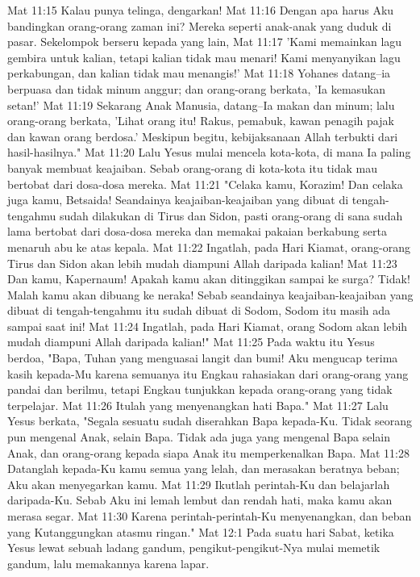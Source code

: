 Mat 11:15  Kalau punya telinga, dengarkan!
Mat 11:16  Dengan apa harus Aku bandingkan orang-orang zaman ini? Mereka seperti anak-anak yang duduk di pasar. Sekelompok berseru kepada yang lain,
Mat 11:17  'Kami memainkan lagu gembira untuk kalian, tetapi kalian tidak mau menari! Kami menyanyikan lagu perkabungan, dan kalian tidak mau menangis!'
Mat 11:18  Yohanes datang--ia berpuasa dan tidak minum anggur; dan orang-orang berkata, 'Ia kemasukan setan!'
Mat 11:19  Sekarang Anak Manusia, datang--Ia makan dan minum; lalu orang-orang berkata, 'Lihat orang itu! Rakus, pemabuk, kawan penagih pajak dan kawan orang berdosa.' Meskipun begitu, kebijaksanaan Allah terbukti dari hasil-hasilnya."
Mat 11:20  Lalu Yesus mulai mencela kota-kota, di mana Ia paling banyak membuat keajaiban. Sebab orang-orang di kota-kota itu tidak mau bertobat dari dosa-dosa mereka.
Mat 11:21  "Celaka kamu, Korazim! Dan celaka juga kamu, Betsaida! Seandainya keajaiban-keajaiban yang dibuat di tengah-tengahmu sudah dilakukan di Tirus dan Sidon, pasti orang-orang di sana sudah lama bertobat dari dosa-dosa mereka dan memakai pakaian berkabung serta menaruh abu ke atas kepala.
Mat 11:22  Ingatlah, pada Hari Kiamat, orang-orang Tirus dan Sidon akan lebih mudah diampuni Allah daripada kalian!
Mat 11:23  Dan kamu, Kapernaum! Apakah kamu akan ditinggikan sampai ke surga? Tidak! Malah kamu akan dibuang ke neraka! Sebab seandainya keajaiban-keajaiban yang dibuat di tengah-tengahmu itu sudah dibuat di Sodom, Sodom itu masih ada sampai saat ini!
Mat 11:24  Ingatlah, pada Hari Kiamat, orang Sodom akan lebih mudah diampuni Allah daripada kalian!"
Mat 11:25  Pada waktu itu Yesus berdoa, "Bapa, Tuhan yang menguasai langit dan bumi! Aku mengucap terima kasih kepada-Mu karena semuanya itu Engkau rahasiakan dari orang-orang yang pandai dan berilmu, tetapi Engkau tunjukkan kepada orang-orang yang tidak terpelajar.
Mat 11:26  Itulah yang menyenangkan hati Bapa."
Mat 11:27  Lalu Yesus berkata, "Segala sesuatu sudah diserahkan Bapa kepada-Ku. Tidak seorang pun mengenal Anak, selain Bapa. Tidak ada juga yang mengenal Bapa selain Anak, dan orang-orang kepada siapa Anak itu memperkenalkan Bapa.
Mat 11:28  Datanglah kepada-Ku kamu semua yang lelah, dan merasakan beratnya beban; Aku akan menyegarkan kamu.
Mat 11:29  Ikutlah perintah-Ku dan belajarlah daripada-Ku. Sebab Aku ini lemah lembut dan rendah hati, maka kamu akan merasa segar.
Mat 11:30  Karena perintah-perintah-Ku menyenangkan, dan beban yang Kutanggungkan atasmu ringan."
Mat 12:1  Pada suatu hari Sabat, ketika Yesus lewat sebuah ladang gandum, pengikut-pengikut-Nya mulai memetik gandum, lalu memakannya karena lapar.
